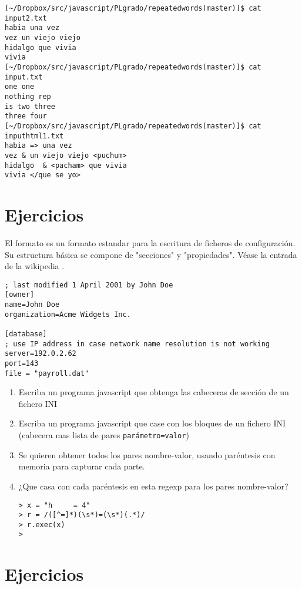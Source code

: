\begin{verbatim}
[~/Dropbox/src/javascript/PLgrado/repeatedwords(master)]$ cat input2.txt 
habia una vez 
vez un viejo viejo
hidalgo que vivia 
vivia
[~/Dropbox/src/javascript/PLgrado/repeatedwords(master)]$ cat input.txt 
one one
nothing rep
is two three
three four
[~/Dropbox/src/javascript/PLgrado/repeatedwords(master)]$ cat inputhtml1.txt 
habia => una vez 
vez & un viejo viejo <puchum>
hidalgo  & <pacham> que vivia 
vivia </que se yo>

\end{verbatim}

\section{Ejercicios}
El formato   es un formato estandar 
para la escritura de ficheros de configuración. 
Su estructura básica se compone de
"secciones" y "propiedades". Véase la entrada de la wikipedia
.
\begin{verbatim}
; last modified 1 April 2001 by John Doe
[owner]
name=John Doe
organization=Acme Widgets Inc.
 
[database]
; use IP address in case network name resolution is not working
server=192.0.2.62     
port=143
file = "payroll.dat"
\end{verbatim}
\begin{enumerate}
\item 
Escriba un programa javascript que obtenga las cabeceras de sección de un fichero 
INI
\item 
Escriba un programa javascript que case con los bloques de un fichero INI (cabecera mas lista de pares \verb|parámetro=valor|)

\item 
Se quieren obtener todos los pares nombre-valor, usando paréntesis con memoria para capturar cada parte.

\item  ¿Que casa con cada paréntesis en esta regexp para los  pares nombre-valor?
\begin{verbatim}
> x = "h     = 4"
> r = /([^=]*)(\s*)=(\s*)(.*)/
> r.exec(x)
>
\end{verbatim}
\end{enumerate}

\section{Ejercicios}


